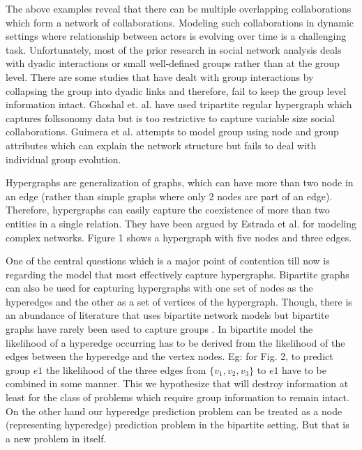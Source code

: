 \documentclass{sig-alternate}
\begin{document}
The above examples reveal that there can be multiple overlapping collaborations which form a network of collaborations. Modeling such collaborations in dynamic settings where relationship between actors is evolving over time is a challenging task. 
Unfortunately, most of the prior research in social network analysis deals with dyadic interactions or small well-defined groups \cite{putnam1996bona} rather than at the group level. There are some studies that have dealt with group interactions by collapsing the group into dyadic links \cite{newman2001structure} and therefore, fail to keep the group level information intact. Ghoshal et. al. \cite{ghoshal2009random} have used tripartite regular hypergraph which captures folksonomy data but is too restrictive to capture variable size social collaborations. Guimera et al. \cite{guimera2005team} attempts to model group using node and group attributes which can explain the network structure but fails to deal with individual group evolution. 

Hypergraphs are generalization of graphs, which can have more than two node in an edge (rather than simple graphs where only 2 nodes are part of an edge). Therefore, hypergraphs can easily capture the coexistence of more than two entities in a single relation. They have been argued by Estrada et al. \cite{estrada2005complex} for modeling complex networks. Figure 1 shows a hypergraph with five nodes and three edges.

One of the central questions which is a major point of contention till now is regarding the model that most effectively capture hypergraphs. Bipartite graphs can also be used for capturing hypergraphs with one set of nodes as the hyperedges and the other as a set of vertices of the hypergraph. Though, there is an abundance of literature that uses bipartite network models \cite{clusteringdhillon}\cite{clustering2}\cite{clustering3} but bipartite graphs have rarely been used to capture groups \cite{faust1997centrality}\cite{RDF}. In bipartite model the likelihood of a hyperedge occurring has to be derived from the likelihood of the edges between the hyperedge and the vertex nodes. Eg: for Fig. 2, to predict group $e1$ the likelihood of the three edges from $\{v_1,v_2,v_3\}$ to $e1$ have to be combined in some manner. \cite{dhruv2013} This we hypothesize that will destroy information at least for the class of problems which require group information to remain intact. On the other hand our hyperedge prediction problem can be treated as a node (representing hyperedge) prediction problem in the bipartite setting. But that is a new problem in itself. 
\end{document}
